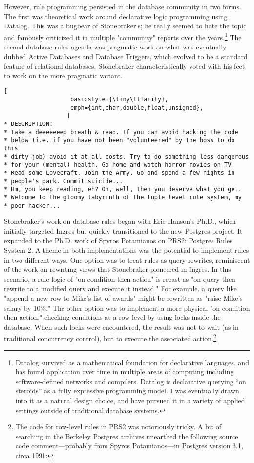 \documentclass[sigconf,natbib=false]{acmart}
\begin{document}
However, rule programming persisted in the database community in two forms. The first was theoretical work around declarative logic programming using Datalog. This was a bugbear of Stonebraker's; he really seemed to hate the topic and famously criticized it in multiple "community" reports over the years.\footnote{Datalog survived as a mathematical foundation for declarative languages, and has found application over time in multiple areas of computing including software-defined networks and compilers. Datalog is declarative querying ``on steroids'' as a fully expressive programming model. I was eventually drawn into it as a natural design choice, and have pursued it in a variety of applied settings outside of traditional database systems.} The second database rules agenda was pragmatic work on what was eventually dubbed Active Databases and Database Triggers, which evolved to be a standard feature of relational databases. Stonebraker characteristically voted with his feet to work on the more pragmatic variant.


\begin{lrbox}{\LstBox}
\begin{lstlisting}[
				   basicstyle={\tiny\ttfamily},
                   emph={int,char,double,float,unsigned},
                  ]
* DESCRIPTION:
* Take a deeeeeeep breath & read. If you can avoid hacking the code
* below (i.e. if you have not been "volunteered" by the boss to do this
* dirty job) avoid it at all costs. Try to do something less dangerous
* for your (mental) health. Go home and watch horror movies on TV.
* Read some Lovecraft. Join the Army. Go and spend a few nights in
* people's park. Commit suicide...
* Hm, you keep reading, eh? Oh, well, then you deserve what you get.
* Welcome to the gloomy labyrinth of the tuple level rule system, my
* poor hacker...
\end{lstlisting}
\end{lrbox}

Stonebraker's work on database rules began with Eric Hanson's Ph.D., which initially targeted Ingres but quickly transitioned to the new Postgres project. It expanded to the Ph.D. work of Spyros Potamianos on PRS2: Postgres Rules System 2. A theme in both implementations was the potential to implement rules in two different ways. One option was to treat rules as query rewrites, reminiscent of the work on rewriting views that Stonebraker pioneered in Ingres. In this scenario, a rule logic of "on condition then action" is recast as "on query then rewrite to a modified query and execute it instead." For example, a query like "append a new row to Mike's list of awards" might be rewritten as "raise Mike's salary by 10\%." The other option was to implement a more physical "on condition then action," checking conditions at a row level by using locks inside the database. When such locks were encountered, the result was not to wait (as in traditional concurrency control), but to execute the associated action.\footnote{The code for row-level rules in PRS2 was notoriously tricky. A bit of searching in the Berkeley Postgres archives unearthed the following source code comment---probably from Spyros Potamianos---in Postgres version 3.1, circa 1991: \usebox{\LstBox}
}
\end{document}

